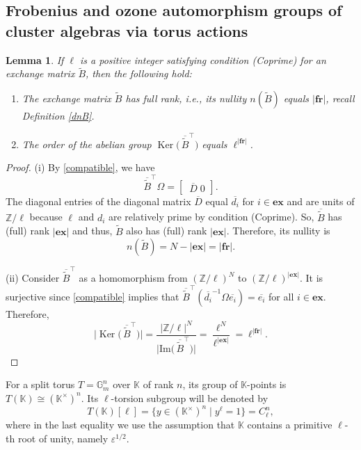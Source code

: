 \documentclass[11pt]{amsart}
\theoremstyle{plain}
\newtheorem{lemma}[theorem]{Lemma}
\newcommand \ble[1] { \begin{lemma}\label{l#1} }
\newcommand {\ele} { \end{lemma} }
\newcommand \deref[1]{Definition \ref{d#1}}
\def \KK {{\mathbb C}}
\def \KK {{\mathbb K}}
\def \Gset {{\mathbb G}}
\def \Zset {{\mathbb Z}}
\def \B  {{\widetilde{B}}}
\newcommand \ex {{\mathbf{ex}}}
\newcommand \fr {{\mathbf{fr}}}
\def \ep {\varepsilon}
\def \ol {\overline}
\DeclareMathOperator \Ker { {\mathrm{Ker}} }
\renewcommand \Im { {\mathrm{Im}} }
\begin{document}
\subsection{Frobenius and ozone automorphism groups of cluster algebras via torus actions}
\ble{nullity} If $\ell$ is a positive integer satisfying condition (Coprime) for an exchange matrix $\B$, 
then the following hold:
\begin{enumerate}
\item[(i)] The exchange matrix $\B$ has full rank, i.e., its nullity $n(\B)$ equals $|\fr|$, recall \deref{nB}.  
\item[(ii)] The order of the abelian group $\Ker \big( \, \ol{\B}^\top \big)$ equals $\ell^{|\fr|}$.
\end{enumerate}
\ele
\begin{proof} 
(i) By \eqref{compatible}, we have 
\[
\ol{\B}^\top \Omega  = 
\begin{bmatrix}
\, \ol{D} \; 0
\end{bmatrix} . 
\]  
The diagonal entries of the diagonal matrix $\ol{D}$ equal
$\ol{d_i}$ for $i \in \ex$ and are units of $\Zset/ \ell$ because $\ell$ and $d_i$ are relatively prime by condition (Coprime). So, $\ol{\B}$ has (full) rank $|\ex|$ and thus, $\B$ also has (full) rank $|\ex|$. Therefore, its nullity is 
\[
n(\B) = N - |\ex| = |\fr|.
\]

(ii) Consider $\ol{\B}^\top$ as a homomorphism from 
$(\Zset/\ell)^N$ to $(\Zset/\ell)^{|\ex|}$. It is surjective since \eqref{compatible} implies that $\ol{\B}^\top ( \ol{d_i}^{-1} \Omega \ol{e_i}) = \ol{e_i}$ for all $i \in \ex$. Therefore, 
\[
\Big| \Ker \big( \, \ol{\B}^\top \big) \Big| = \frac{|\Zset/\ell|^N}{\Big| \Im \big( \, \ol{\B}^\top \big) \Big|} = 
\frac{\ell^N}{\ell^{|\ex|}}= \ell^{|\fr|}.
\]
\end{proof}

For a split torus $T = \Gset_m^n$ over $\KK$ of rank $n$, its group of $\KK$-points is $T(\KK)\cong (\KK^\times)^n$. Its $\ell$-torsion subgroup will be denoted by 
\[
T(\KK)[\ell] = \{ y \in (\KK^\times)^n \mid y^\ell = 1 \} = C_\ell^n, 
\]
where in the last equality we use the assumption that $\KK$ contains a primitive $\ell$-th root of unity, namely $\ep^{1/2}$.
\end{document}
